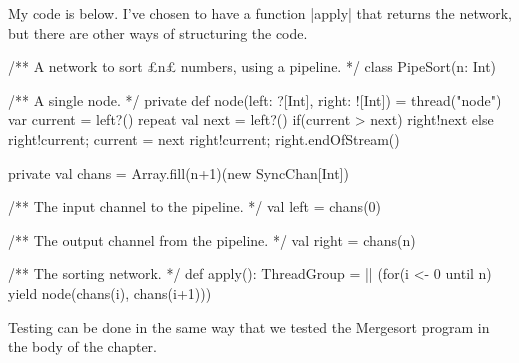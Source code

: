 \begin{answerI}
My code is below.  I've chosen to have a function |apply| that returns the
network, but there are other ways of structuring the code. 
%
\begin{scala}
/** A network to sort £n£ numbers, using a pipeline. */
class PipeSort(n: Int){
  /** A single node. */
  private def node(left: ?[Int], right: ![Int]) = thread("node"){
    var current = left?()
    repeat{
      val next = left?()
      if(current > next) right!next
      else { right!current; current = next }
    }
    right!current; right.endOfStream()
  }

  private val chans = Array.fill(n+1)(new SyncChan[Int])

  /** The input channel to the pipeline. */
  val left = chans(0)

  /** The output channel from the pipeline. */
  val right = chans(n)

  /** The sorting network. */
  def apply(): ThreadGroup =
    || (for(i <- 0 until n) yield node(chans(i), chans(i+1)))
}
\end{scala}

Testing can be done in the same way that we tested the Mergesort program in
the body of the chapter.






\end{answerI}
